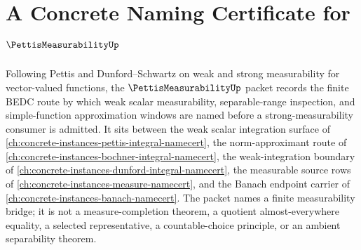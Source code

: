 \chapter{A Concrete Naming Certificate for $\PettisMeasurabilityUp$}
\label{ch:concrete-instances-pettis-measurability-namecert}

Following Pettis and Dunford--Schwartz on weak and strong measurability for vector-valued functions, the $\PettisMeasurabilityUp$ packet records the finite BEDC route by which weak scalar measurability, separable-range inspection, and simple-function approximation windows are named before a strong-measurability consumer is admitted. It sits between the weak scalar integration surface of \autoref{ch:concrete-instances-pettis-integral-namecert}, the norm-approximant route of \autoref{ch:concrete-instances-bochner-integral-namecert}, the weak-integration boundary of \autoref{ch:concrete-instances-dunford-integral-namecert}, the measurable source rows of \autoref{ch:concrete-instances-measure-namecert}, and the Banach endpoint carrier of \autoref{ch:concrete-instances-banach-namecert}. The packet names a finite measurability bridge; it is not a measure-completion theorem, a quotient almost-everywhere equality, a selected representative, a countable-choice principle, or an ambient separability theorem.

